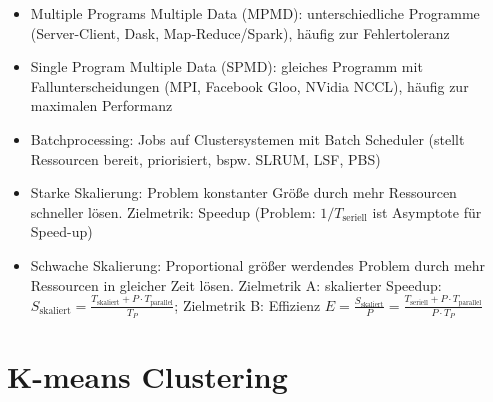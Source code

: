 \documentclass[11pt]{scrartcl}
\begin{document}
\begin{itemize}
    (C++), High-level Script API (Python)
    \item Multiple Programs Multiple Data (MPMD): unterschiedliche Programme (Server-Client,
    Dask, Map-Reduce/Spark), häufig zur Fehlertoleranz
    \item Single Program Multiple Data (SPMD): gleiches Programm mit Fallunterscheidungen (MPI,
    Facebook Gloo, NVidia NCCL), häufig zur maximalen Performanz
    \item Batchprocessing: Jobs auf Clustersystemen mit Batch Scheduler (stellt Ressourcen 
    bereit, priorisiert, bspw. SLRUM, LSF, PBS)
    \item Starke Skalierung: Problem konstanter Größe durch mehr Ressourcen schneller lösen. 
    Zielmetrik: Speedup (Problem: $1 / T_{\mathrm{seriell}}$ ist Asymptote für Speed-up)
    \item Schwache Skalierung: Proportional größer werdendes Problem durch mehr Ressourcen
    in gleicher Zeit lösen. Zielmetrik A: skalierter Speedup: $S_\mathrm{skaliert} = 
    \frac{T_\mathrm{skaliert} + P \cdot T_\mathrm{parallel}}{T_P}$; Zielmetrik B: Effizienz 
    $E = \frac{S_\mathrm{skaliert}}{P} = \frac{T_\mathrm{seriell} + P \cdot T_\mathrm{parallel}}{P \cdot T_P}$
\end{itemize}

\section{K-means Clustering}
\end{document}

